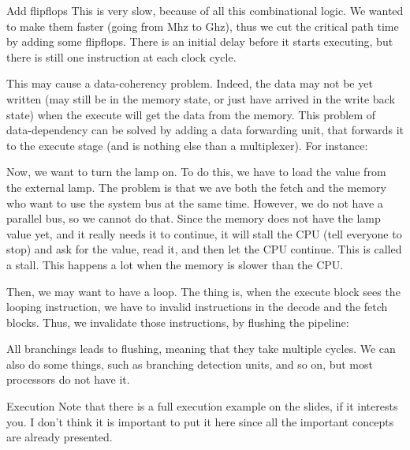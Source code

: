 \documentclass[a4paper]{article}
\begin{document}
\begin{parag}{Add flipflops}
    This is very slow, because of all this combinational logic. We wanted to make them faster (going from Mhz to Ghz), thus we cut the critical path time by adding some flipflops. There is an initial delay before it starts executing, but there is still one instruction at each clock cycle.

    This may cause a data-coherency problem. Indeed, the data may not be yet written (may still be in the memory state, or just have arrived in the write back state) when the execute will get the data from the memory. This problem of data-dependency can be solved by adding a data forwarding unit, that forwards it to the execute stage (and is nothing else than a multiplexer). For instance:

    Now, we want to turn the lamp on. To do this, we have to load the value from the external lamp. The problem is that we ave both the fetch and the memory who want to use the system bus at the same time. However, we do not have a parallel bus, so we cannot do that. Since the memory does not have the lamp value yet, and it really needs it to continue, it will stall the CPU (tell everyone to stop) and ask for the value, read it, and then let the CPU continue. This is called a stall. This happens a lot when the memory is slower than the CPU.

    Then, we may want to have a loop. The thing is, when the execute block sees the looping instruction, we have to invalid instructions in the decode and the fetch blocks. Thus, we invalidate those instructions, by flushing the pipeline:

    All branchings leads to flushing, meaning that they take multiple cycles. We can also do some things, such as branching detection units, and so on, but most processors do not have it.
\end{parag}

\begin{parag}{Execution}
    Note that there is a full execution example on the slides, if it interests you. I don't think it is important to put it here since all the important concepts are already presented.
\end{parag}
\end{document}
